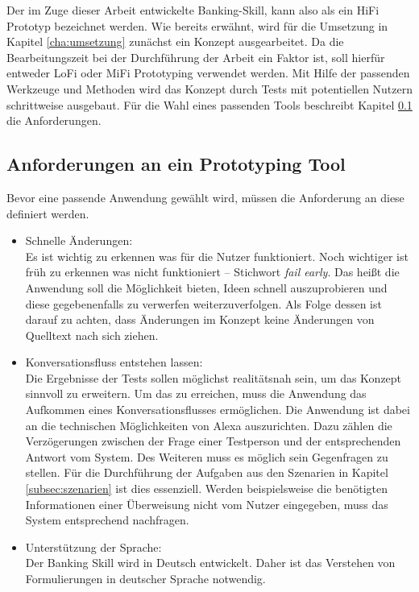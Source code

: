 Der im Zuge dieser Arbeit entwickelte Banking-Skill, kann also als ein \ac{HiFi} Prototyp bezeichnet werden. Wie bereits erwähnt, wird für die Umsetzung in Kapitel \ref{cha:umsetzung} zunächst ein Konzept ausgearbeitet. Da die Bearbeitungszeit bei der Durchführung der Arbeit ein Faktor ist, soll hierfür entweder \ac{LoFi} oder \ac{MiFi} Prototyping verwendet werden. Mit Hilfe der passenden Werkzeuge und Methoden wird das Konzept durch Tests mit potentiellen Nutzern schrittweise ausgebaut. Für die Wahl eines passenden Tools beschreibt Kapitel \ref{subsec:anforderungen-prototyping} die Anforderungen.

\subsection{Anforderungen an ein Prototyping Tool}
\label{subsec:anforderungen-prototyping}
Bevor eine passende Anwendung gewählt wird, müssen die Anforderung an diese definiert werden.
\begin{itemize}
\item Schnelle Änderungen:\\
Es ist wichtig zu erkennen was für die Nutzer funktioniert. Noch wichtiger ist früh zu erkennen was nicht funktioniert -- Stichwort \textit{fail early}. Das heißt die Anwendung soll die Möglichkeit bieten, Ideen schnell auszuprobieren und diese gegebenenfalls zu verwerfen \bzw weiterzuverfolgen. Als Folge dessen ist darauf zu achten, dass Änderungen im Konzept keine Änderungen von Quelltext nach sich ziehen.

\item Konversationsfluss entstehen lassen:\\
Die Ergebnisse der Tests sollen möglichst realitätsnah sein, um das Konzept sinnvoll zu erweitern. Um das zu erreichen, muss die Anwendung das Aufkommen eines Konversationsflusses ermöglichen. Die Anwendung ist dabei an die technischen Möglichkeiten von Alexa auszurichten. Dazu zählen die Verzögerungen zwischen der Frage einer Testperson und der entsprechenden Antwort vom System. Des Weiteren muss es möglich sein Gegenfragen zu stellen. Für die Durchführung der Aufgaben aus den Szenarien in Kapitel \ref{subsec:szenarien} ist dies essenziell. Werden beispielsweise die benötigten Informationen einer Überweisung nicht vom Nutzer eingegeben, muss das System entsprechend nachfragen.

\item Unterstützung der Sprache:\\
Der Banking Skill wird in Deutsch entwickelt. Daher ist das Verstehen von Formulierungen in deutscher Sprache notwendig. 
\end{itemize}

